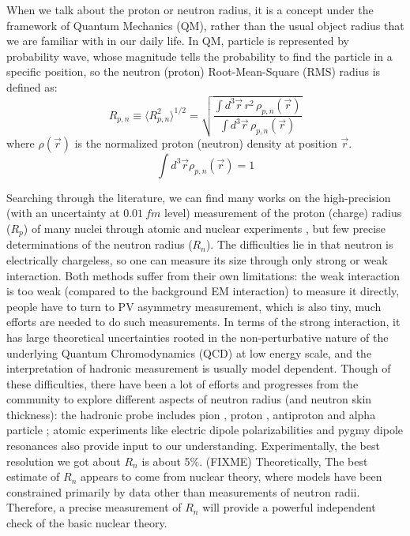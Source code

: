 When we talk about the proton or neutron radius, it is a concept under the
framework of Quantum Mechanics (QM), rather than the usual object radius that we
are familiar with in our daily life. In QM, particle is represented by probability
wave, whose magnitude tells the probability to find the particle in a specific
position, so the neutron (proton) Root-Mean-Square (RMS) radius is defined as:
\begin{equation}
    R_{p, n} \equiv \langle R_{p,n}^2\rangle^{1/2} = \sqrt{\frac{\int d^3\vec{r}\,r^2\,\rho_{p,n}(\vec{r})}{\int d^3\vec{r}\,\rho_{p,n}(\vec{r})}}
    \label{eq:nucleon_rms_radius}
\end{equation}
where $\rho(\vec{r})$ is the normalized proton (neutron) density at position $\vec{r}$.
\begin{equation}
    \int d^3\vec{r} \rho_{p, n}(\vec{r}) = 1 
\end{equation}

Searching through the literature, we can find many works on the high-precision  
(with an uncertainty at $0.01 \ fm$ level)
measurement of the proton (charge) radius ($R_p$) of many nuclei through atomic 
and nuclear experiments \cite{DEVRIES1987495, ANGELI2004185}, but few
precise determinations of the neutron radius ($R_n$). The difficulties lie in that
neutron is electrically chargeless, so one can measure its size through only 
strong or weak interaction. Both methods suffer from their own
limitations: the weak interaction is too weak (compared to the background EM 
interaction) to measure it directly, people have to turn to PV asymmetry
measurement, which is also tiny, much efforts are needed to do such measurements.
In terms of the strong interaction, it has large theoretical uncertainties rooted 
in the non-perturbative nature of the underlying Quantum Chromodynamics (QCD) at low energy scale, 
and the interpretation of hadronic measurement is usually model dependent. Though of these
difficulties, there have been a lot of efforts and progresses from the community to explore
different aspects of neutron radius (and neutron skin thickness): 
the hadronic probe includes pion \cite{ALLARDYCE19731}, proton \cite{LOMBARDI1972103}, 
antiproton \cite{PhysRevC.76.014311} and alpha particle \cite{FRIEDMAN1969213,PhysRevC.5.234};
atomic experiments like electric dipole polarizabilities \cite{Roca_Maza_2012} and 
pygmy dipole resonances \cite{PhysRevC.88.044610}
also provide input to our understanding.
Experimentally, the best resolution we got about $R_n$ is about 5\%. (FIXME)
Theoretically, The best estimate of $R_n$ appears to come from nuclear theory, 
where models have been constrained primarily by data other than measurements 
of neutron radii. Therefore, a precise measurement of $R_n$ will provide a powerful 
independent check of the basic nuclear theory.

